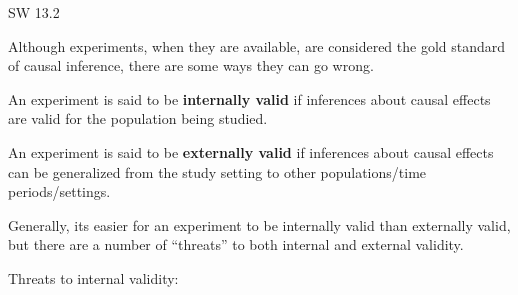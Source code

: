 \documentclass[
  letterpaper,
  DIV=11,
  numbers=noendperiod]{scrreprt}
\begin{document}
SW 13.2

Although experiments, when they are available, are considered the gold
standard of causal inference, there are some ways they can go wrong.

An experiment is said to be \textbf{internally valid} if inferences
about causal effects are valid for the population being studied.

An experiment is said to be \textbf{externally valid} if inferences
about causal effects can be generalized from the study setting to other
populations/time periods/settings.

Generally, its easier for an experiment to be internally valid than
externally valid, but there are a number of ``threats'' to both internal
and external validity.

Threats to internal validity:
\end{document}
